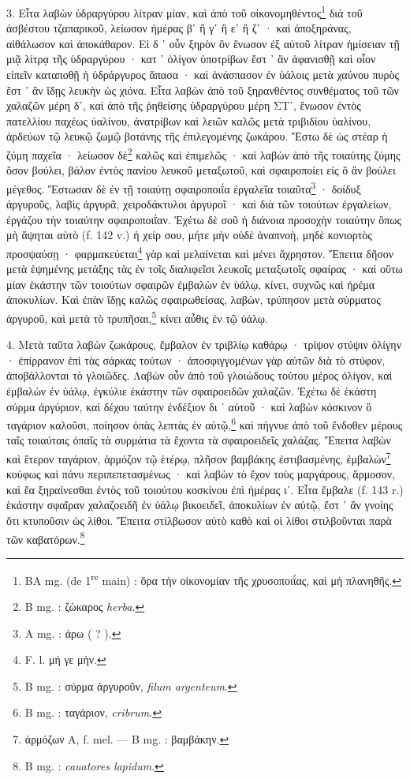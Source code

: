 \documentclass[a4paper, 11pt, oneside, polutonikogreek, french]{article}
\begin{document}
3. Εἶτα λαβὼν ὑδραργύρου λίτραν μίαν, καὶ ἀπὸ τοῦ οἰκονομηθέντος\footnote{BA mg. (de 1\textsuperscript{re} main) : ὅρα τὴν οἰκονομίαν τῆς χρυσοποιΐας, καὶ μὴ πλανηθῆς.} διὰ τοῦ ἀσβέστου τζαπαρικοῦ, λείωσον ἡμέρας βʹ ἢ γʹ ἢ εʹ ἢ ζʹ · καὶ ἀποξηράνας, αἰθάλωσον καὶ ἀποκάθαρον. Εἰ δ ᾽ οὖν ξηρὸν ὂν ἕνωσον ἐξ αὐτοῦ λίτραν ἡμίσειαν τῇ μιᾷ λίτρᾳ τῆς ὑδραργύρου · κατ ᾽ ὀλίγον ὑποτρίβων ἔστ ᾽ ἂν ἀφανισθῇ καὶ οἷον εἰπεῖν καταποθῇ ἡ ὑδράργυρος ἅπασα · καὶ ἀνάσπασον ἐν ὑάλοις μετὰ χαύνου πυρὸς ἔστ ᾽ ἂν ἴδῃς λευκὴν ὡς χιόνα. Εἶτα λαβὼν ἀπὸ τοῦ ξηρανθέντος συνθέματος τοῦ τῶν χαλαζῶν μέρη δʹ, καὶ ἀπὸ τῆς ῥηθείσης ὑδραργύρου μέρη ΣΤʹ, ἕνωσον ἐντὸς πατελλίου παχέως ὑαλίνου, ἀνατρίβων καὶ λειῶν καλῶς μετὰ τριβιδίου ὑαλίνου, ἀρδεύων τῷ λευκῷ ζωμῷ βοτάνης τῆς ἐπιλεγομένης ζωκάρου. Ἔστω δὲ ὡς στέαρ ἡ ζύμη παχεῖα · λείωσον δὲ\footnote{B mg. : ζώκαρος \emph{herba}.} καλῶς καὶ ἐπιμελῶς · καὶ λαβὼν ἀπὸ τῆς τοιαύτης ζύμης ὅσον βούλει, βάλον ἐντὸς πανίου λευκοῦ μεταξωτοῦ, καὶ σφαιροποίει εἰς ὃ ἂν βούλει μέγεθος. Ἔστωσαν δὲ ἐν τῇ τοιαύτῃ σφαιροποιΐα ἐργαλεῖα τοιαῦτα\footnote{A mg. : ἀρω ( ? ).} · δοίδυξ ἀργυροῦς, λαβὶς ἀργυρᾶ, χειροδάκτυλοι ἀργυροῖ · καὶ διὰ τῶν τοιούτων ἐργαλείων, ἐργάζου τὴν τοιαύτην σφαιροποιΐαν. Ἐχέτω δὲ σοῦ ἡ διάνοια προσοχὴν τοιαύτην ὅπως μὴ ἅψηται αὐτὸ (f. 142 v.) ἡ χείρ σου, μήτε μὴν οὐδὲ ἀναπνοὴ, μηδὲ κονιορτὸς προσψαύσῃ · φαρμακεύεται\footnote{F. l. μή γε μὴν.} γὰρ καὶ μελαίνεται καὶ μένει ἄχρηστον. Ἔπειτα δῆσον μετὰ ἑψημένης μετάξης τὰς ἐν τοῖς διαλιφεῖσι λευκοῖς μεταξωτοῖς σφαίρας · καὶ οὕτω μίαν ἑκάστην τῶν τοιούτων σφαιρῶν ἐμβαλὼν ἐν ὑάλῳ, κίνει, συχνῶς καὶ ἠρέμα ἀποκυλίων. Καὶ ἐπὰν ἴδῃς καλῶς σφαιρωθείσας, λαβὼν, τρύπησον μετὰ σύρματος ἀργυροῦ, καὶ μετὰ τὸ τρυπῆσαι,\footnote{B mg. : σύρμα ἀργυροῦν, \emph{filum argenteum}.} κίνει αὖθις ἐν τῷ ὑάλῳ.

4. Μετὰ ταῦτα λαβὼν ζωκάρους, ἔμβαλον ἐν τριβλίῳ καθάρῳ · τρίψον στύψιν ὀλίγην · ἐπίρρανον ἐπὶ τὰς σάρκας τούτων · ἀποσφιγγομένων γὰρ αὐτῶν διὰ τὸ στύφον, ἀποβάλλονται τὸ γλοιῶδες. Λαβὼν οὖν ἀπὸ τοῦ γλοιώδους τούτου μέρος ὀλίγον, καὶ ἐμβαλὼν ἐν ὑάλῳ, ἐγκύλιε ἑκάστην τῶν σφαιροειδῶν χαλαζῶν. Ἐχέτω δὲ ἑκάστη σύρμα ἀργύριον, καὶ δέχου ταύτην ἐνδέξιον δι ᾽ αὐτοῦ · καὶ λαβὼν κόσκινον ὃ ταγάριον καλοῦσι, ποίησον ὀπὰς λεπτὰς ἐν αὐτῷ,\footnote{B mg. : ταγάριον, \emph{cribrum}.} καὶ πήγνυε ἀπὸ τοῦ ἔνδοθεν μέρους ταῖς τοιαύταις ὀπαῖς τὰ συρμάτια τὰ ἔχοντα τὰ σφαιροειδεῖς χαλάζας. Ἔπειτα λαβὼν καὶ ἕτερον ταγάριον, ἁρμόζον τῷ ἑτέρῳ, πλῆσον βαμβάκης ἐστιβασμένης, ἐμβαλὼν\footnote{ἁρμόζων A, f. mel. --- B mg. : βαμβάκην.} κούφως καὶ πάνυ περιπεπετασμένως · καὶ λαβὼν τὸ ἔχον τοὺς μαργάρους, ἅρμοσον, καὶ ἔα ξηραίνεσθαι ἐντὸς τοῦ τοιούτου κοσκίνου ἐπὶ ἡμέρας ιʹ. Εἶτα ἔμβαλε (f. 143 r.) ἑκάστην σφαῖραν χαλαζοειδῆ ἐν ὑάλῳ βικοειδεῖ, ἀποκυλίων ἐν αὐτῷ, ἔστ ᾽ ἂν γνοίης ὅτι κτυποῦσιν ὡς λίθοι. Ἔπειτα στίλβωσον αὐτὸ καθὸ καὶ οἱ λίθοι στιλβοῦνται παρὰ τῶν καβατόρων.\footnote{B mg. : \emph{cauatores lapidum}.}
\end{document}
